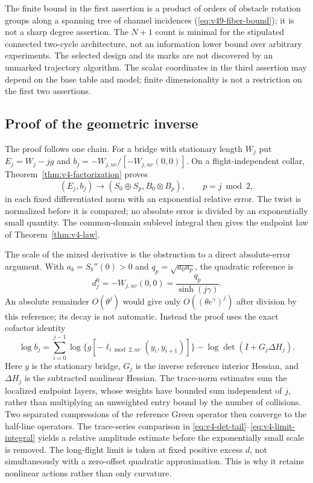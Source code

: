 The finite bound in the first assertion is a product of orders of
obstacle rotation groups along a spanning tree of channel incidences
(\eqref{eq:v49-fiber-bound}); it is not a sharp degree assertion.
The $N+1$ count is minimal for the stipulated connected two-cycle
architecture, not an information lower bound over arbitrary experiments.
The selected design and its marks are not discovered by an unmarked
trajectory algorithm.  The scalar coordinates in the third assertion
may depend on the base table and model; finite dimensionality is not a
restriction on the first two assertions.



\subsection{Proof of the geometric inverse}

The proof follows one chain.  For a bridge with stationary length
$W_j$ put $E_j=W_j-jg$ and
$b_j=-W_{j,uv}/[-W_{j,uv}(0,0)]$.  On a flight-independent collar,
Theorem~\ref{thm:v4-factorization} proves
\[
 (E_j,b_j)\longrightarrow(S_0\oplus S_p,B_0\otimes B_p),
                  \qquad p=j\bmod2,
\]
in each fixed differentiated norm with an exponential relative error.
The twist is normalized before it is compared; no absolute error is
divided by an exponentially small quantity.  The common-domain sublevel
integral then gives the endpoint law of
Theorem~\ref{thm:v4-law}.

The scale of the mixed derivative is the obstruction to a direct
absolute-error argument.  With $a_b=S_b''(0)>0$ and
$q_p=\sqrt{a_0a_p}$, the quadratic reference is
\begin{equation}\label{eq:v50-reference-scale}
 d_j^0=-W_{j,uv}(0,0)=\frac{q_p}{\sinh(j\gamma)}.
\end{equation}
An absolute remainder $O(\theta^j)$ would give only
$O((\theta e^\gamma)^j)$ after division by this reference; its
decay is not automatic.  Instead the proof uses the exact cofactor
identity
\begin{equation}\label{eq:v50-relative-log}
 \log b_j=\sum_{i=0}^{j-1}
 \log\{g[-\ell_{i\bmod2,uv}(y_i,y_{i+1})]\}
                   -\log\det(I+G_j\Delta H_j).
\end{equation}
Here $y$ is the stationary bridge, $G_j$ is the inverse reference
interior Hessian, and $\Delta H_j$ is the subtracted nonlinear
Hessian.  The trace-norm estimates sum the localized endpoint layers,
whose weights have bounded sum independent of $j$, rather than
multiplying an unweighted entry bound by the number of collisions.
Two separated compressions of the reference Green operator then
converge to the half-line operators.  The trace-series comparison in
\eqref{eq:v4-det-tail}--\eqref{eq:v4-limit-integral} yields a
relative amplitude estimate before the exponentially small scale is
removed.  The long-flight limit is taken at fixed positive excess
$d$, not simultaneously with a zero-offset quadratic approximation.
This is why it retains nonlinear actions rather than only curvature.

